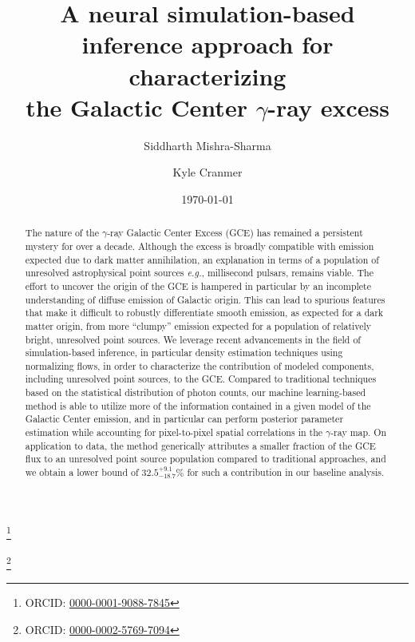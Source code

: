 \documentclass[prd,aps,10pt,nofootinbib,twocolumn,superscriptaddress,preprintnumbers,balancelastpage,longbibliography]{revtex4-1}
\begin{document}

\title{A neural simulation-based inference approach for characterizing \\ the Galactic Center $\gamma$-ray excess}

\author{Siddharth Mishra-Sharma}
\thanks{ORCID: \href{https://orcid.org/0000-0001-9088-7845}{0000-0001-9088-7845}}

\author{Kyle Cranmer}
\thanks{ORCID: \href{https://orcid.org/0000-0002-5769-7094}{0000-0002-5769-7094}}

\date{\today}

\begin{abstract}
The nature of the \Fermi $\gamma$-ray Galactic Center Excess (GCE) has remained a persistent mystery for over a decade. Although the excess is broadly compatible with emission expected due to dark matter annihilation, an explanation in terms of a population of unresolved astrophysical point sources \emph{e.g.}, millisecond pulsars, remains viable. The effort to uncover the origin of the GCE is hampered in particular by an incomplete understanding of diffuse emission of Galactic origin. This can lead to spurious features that make it difficult to robustly differentiate smooth emission, as expected for a dark matter origin, from more ``clumpy'' emission expected for a population of relatively bright, unresolved point sources. We leverage recent advancements in the field of simulation-based inference, in particular density estimation techniques using normalizing flows, in order to characterize the contribution of modeled components, including unresolved point sources, to the GCE. Compared to traditional techniques based on the statistical distribution of photon counts, our machine learning-based method is able to utilize more of the information contained in a given model of the Galactic Center emission, and in particular can perform posterior parameter estimation while accounting for pixel-to-pixel spatial correlations in the $\gamma$-ray map. On application to \Fermi data, the method generically attributes a smaller fraction of the GCE flux to an unresolved point source population compared to traditional approaches, and we obtain a lower bound of $32.5^{+9.1}_{-18.7}\%$ for such a contribution in our baseline analysis.
\end{abstract}
\end{document}
